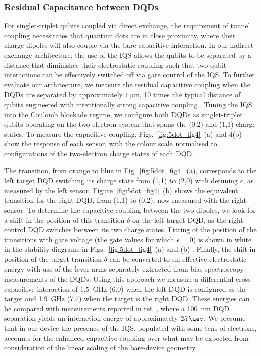 \subsubsection{Residual Capacitance between DQDs}
For singlet-triplet qubits coupled via direct exchange, the requirement of tunnel coupling necessitates that quantum dots are in close proximity, where their charge dipoles will also couple via the bare capacitive interaction. In our indirect-exchange architecture, the use of the IQS allows the qubits to be separated by a distance that diminishes their electrostatic coupling such that two-qubit interactions can be effectively switched off via gate control of the IQS. To further evaluate our architecture, we measure the residual capacitive coupling when the DQDs are separated by approximately $\SI{1}{\micro\meter}$, 10 times the typical distance of qubits engineered with intentionally strong capacitive coupling \cite{PhysRevLett.107.030506,Shulman202}. Tuning the IQS into the Coulomb blockade regime, we configure both DQDs as singlet-triplet qubits operating on the two-electron system that spans the (0,2) and (1,1) charge states. To measure the capacitive coupling, Figs.~\ref{fig:5dot_fig4}~(a) and 4(b) show the response of each sensor, with the colour scale normalised to configurations of the two-electron charge states of each DQD.

The transition, from orange to blue in Fig.~\ref{fig:5dot_fig4}~(a), corresponds to the left target DQD switching its charge state from (1,1) to (2,0) with detuning $\epsilon$, as measured by the left sensor. Figure~\ref{fig:5dot_fig4}~(b) shows the equivalent transition for the right DQD, from (1,1) to (0,2), now measured with the right sensor. To determine the capacitive coupling between the two dipoles, we look for a shift in the position of this transition $\delta$ on the left target DQD, as the right control DQD switches between its two charge states. Fitting of the position of the transitions with gate voltage (the gate values for which $\epsilon$ = 0) is shown in white in the stability diagrams in Figs.~\ref{fig:5dot_fig4}~(a) and (b) \cite{PhysRevLett.92.226801}. Finally, the shift in position of the target transition $\delta$ can be converted to an effective electrostatic energy with use of the lever arms separately extracted from bias-spectroscopy measurements of the DQDs. Using this approach we measure a differential cross-capacitive interaction of \SI{1.5}{\giga\hertz} (\SI{6.0}{\uev})  when the left DQD is configured as the target and  \SI{1.9}{\giga\hertz} (\SI{7.7}{\uev}) when the target is the right DQD. These energies can be compared with measurements reported in ref. \cite{PhysRevLett.107.030506}, where a \SI{100}{\nano\meter} DQD separation yields an interaction energy of approximately $\SI{25}{\uev}$.  We presume that in our device the presence of the IQS, populated with some tens of electrons, accounts for the enhanced capacitive coupling over what may be expected from consideration of the linear scaling of the bare-device geometry.

